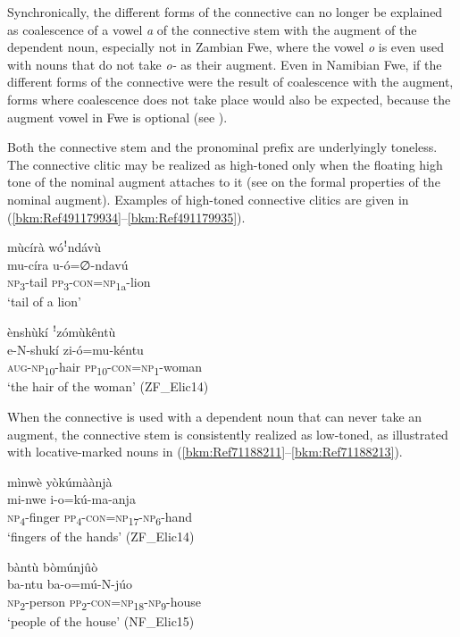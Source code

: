 Synchronically, the different forms of the connective can no longer be explained as coalescence of a vowel \textit{a} of the connective stem with the augment of the dependent noun, especially not in Zambian Fwe, where the vowel \textit{o} is even used with nouns that do not take \textit{o-} as their augment. Even in Namibian Fwe, if the different forms of the connective were the result of coalescence with the augment, forms where coalescence does not take place would also be expected, because the augment vowel in Fwe is optional (see ).

Both the connective stem and the pronominal prefix are underlyingly toneless. The connective clitic may be realized as high-toned only when the floating high tone of the nominal augment attaches to it (see  on the formal properties of the nominal augment). Examples of high-toned connective clitics are given in (\ref{bkm:Ref491179934}--\ref{bkm:Ref491179935}).

\ea
\label{bkm:Ref491179934}
mùcírà wóꜝndávù\\
\gll mu-círa  u-ó=∅-ndavú\\
\textsc{np}\textsubscript{3}-tail  \textsc{pp}\textsubscript{3}-\textsc{con}=\textsc{np}\textsubscript{1a}-lion\\
\glt ‘tail of a lion’
\z

\ea
\label{bkm:Ref491179935}
ènshùkí ꜝzómùkêntù\\
\gll e-N-shukí    zi-ó=mu-kéntu\\
\textsc{aug}-\textsc{np}\textsubscript{10}-hair  \textsc{pp}\textsubscript{10}-\textsc{con}=\textsc{np}\textsubscript{1}-woman\\
\glt ‘the hair of the woman’ (ZF\_Elic14)
\z

When the connective is used with a dependent noun that can never take an augment, the connective stem is consistently realized as low-toned, as illustrated with locative-marked nouns in (\ref{bkm:Ref71188211}--\ref{bkm:Ref71188213}).

\ea
\label{bkm:Ref71188211}
mìnwè yòkúmàànjà\\
\gll mi-nwe  i-o=kú-ma-anja\\
\textsc{np}\textsubscript{4}-finger  \textsc{pp}\textsubscript{4}-\textsc{con}=\textsc{np}\textsubscript{17}-\textsc{np}\textsubscript{6}-hand\\
\glt ‘fingers of the hands’ (ZF\_Elic14)
\z

\ea
\label{bkm:Ref71188213}
bàntù bòmúnjûò\\
\gll ba-ntu  ba-o=mú-N-júo\\
\textsc{np}\textsubscript{2}-person  \textsc{pp}\textsubscript{2}-\textsc{con}=\textsc{np}\textsubscript{18}-\textsc{np}\textsubscript{9}-house\\
\glt ‘people of the house’ (NF\_Elic15)
\z

